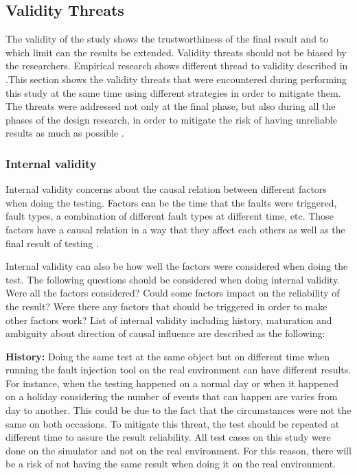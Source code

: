 \subsection{Validity Threats}
The validity of the study shows the trustworthiness of the final result and to which limit can the results be extended. Validity threats should not be biased by the researchers. Empirical research shows different thread to validity described in \cite{feldt2010validity}.This section shows the validity threats that were encountered during performing this study at the same time using different strategies in order to mitigate them. The threats were addressed not only at the final phase, but also during all the phases of the design research, in order to mitigate the risk of having unreliable results as much as possible \cite{guidelines}.

\subsubsection{Internal validity}
Internal validity concerns about the causal relation between different factors when doing the testing. Factors can be the time that the faults were triggered, fault types, a combination of different fault types at different time, etc. Those factors have a causal relation in a way that they affect each others as well as the final result of testing \cite{experimentation}. %

Internal validity can also be how well the factors were considered when doing the test. The following questions should be considered when doing internal validity. Were all the factors considered? Could some factors impact on the reliability of the result? Were there any factors that should be triggered in order to make other factors work? List of internal validity including history, maturation and ambiguity about direction of causal influence are described as the following: 

\textbf{History:} Doing the same test at the same object but on different time when running the fault injection tool on the real environment can have different results. For instance, when the testing happened on a normal day or when it happened on a holiday considering the number of events that can happen are varies from day to another. This could be due to the fact that the circumstances were not the same on both occasions. To mitigate this threat, the test should be repeated at different time to assure the result reliability. All test cases on this study were done on the simulator and not on the real environment. For this reason, there will be a risk of not having the same result when doing it on the real environment.

